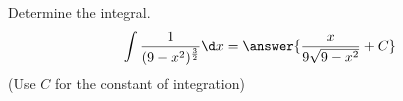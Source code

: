 \documentclass{ximera}
\author{Jason Miller}
\begin{document}
\begin{exercise}
Determine the integral. 
\[
\int \frac{1}{(9-x^{2})^{\frac{3}{2}}}  \d x=\answer{  \frac{x}{9\sqrt{9-x^{2}}}+C}
\]
(Use $C$ for the constant of integration)

\end{exercise}
\end{document}

